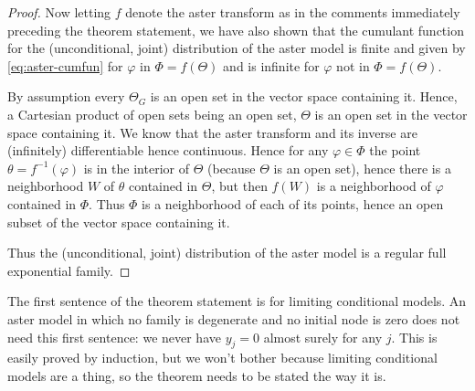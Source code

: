 \begin{proof}
Now letting $f$ denote the aster transform as in the comments immediately
preceding the theorem statement, we have also shown that
the cumulant function for the (unconditional, joint) distribution of
the aster model is finite and given by \eqref{eq:aster-cumfun} for
$\varphi$ in $\Phi = f(\Theta)$ and is infinite for
$\varphi$ not in $\Phi = f(\Theta)$.

By assumption every $\Theta_G$ is an open set in the vector space
containing it.  Hence, a Cartesian product of open sets being an open set,
$\Theta$ is an open set in the vector space containing it.
We know that the aster transform and its inverse are (infinitely)
differentiable hence continuous.  Hence for any $\varphi \in \Phi$
the point $\theta = f^{-1}(\varphi)$ is in the interior of $\Theta$
(because $\Theta$ is an open set), hence there is a neighborhood $W$
of $\theta$ contained in $\Theta$, but then $f(W)$ is a neighborhood of
$\varphi$ contained in $\Phi$.  Thus $\Phi$ is a neighborhood of each
of its points, hence an open subset of the vector space containing it.

Thus the (unconditional, joint) distribution of the aster model
is a regular full exponential family.
\end{proof}

The first sentence of the theorem statement is for limiting conditional
models.
An aster model in which no family is degenerate and no initial node is zero
does not need this first sentence: we never have $y_j = 0$ almost surely
for any $j$.  This is easily proved by induction, but we won't bother
because limiting conditional models are a thing, so the theorem needs
to be stated the way it is.


